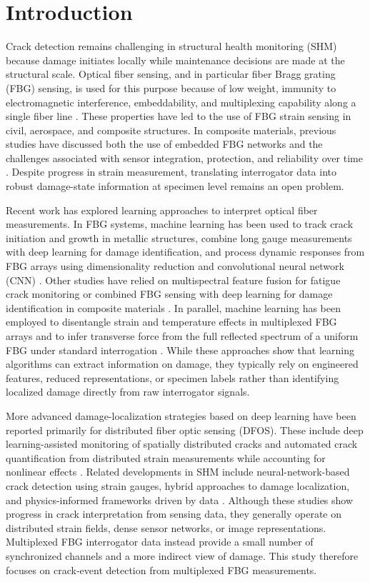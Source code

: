 \documentclass[notspecified,article,submit,pdftex,moreauthors]{Definitions/mdpi}
\begin{document}
\section{Introduction}

Crack detection remains challenging in structural health monitoring (SHM) because damage initiates locally while maintenance decisions are made at the structural scale. Optical fiber sensing, and in particular fiber Bragg grating (FBG) sensing, is used for this purpose because of low weight, immunity to electromagnetic interference, embeddability, and multiplexing capability along a single fiber line \cite{ye2014,yassin2024,golovastikov2025}. These properties have led to the use of FBG strain sensing in civil, aerospace, and composite structures. In composite materials, previous studies have discussed both the use of embedded FBG networks and the challenges associated with sensor integration, protection, and reliability over time \cite{kinet2014,gabardi2023}. Despite progress in strain measurement, translating interrogator data into robust damage-state information at specimen level remains an open problem.

Recent work has explored learning approaches to interpret optical fiber measurements. In FBG systems, machine learning has been used to track crack initiation and growth in metallic structures, combine long gauge measurements with deep learning for damage identification, and process dynamic responses from FBG arrays using dimensionality reduction and convolutional neural network (CNN) \cite{chilelli2019,zhang2020,wang2023}. Other studies have relied on multispectral feature fusion for fatigue crack monitoring or combined FBG sensing with deep learning for damage identification in composite materials \cite{zhao2025,xiong2025}. In parallel, machine learning has been employed to disentangle strain and temperature effects in multiplexed FBG arrays \cite{saha2025} and to infer transverse force from the full reflected spectrum of a uniform FBG under standard interrogation \cite{tocanne2025}. While these approaches show that learning algorithms can extract information on damage, they typically rely on engineered features, reduced representations, or specimen labels rather than identifying localized damage directly from raw interrogator signals.

More advanced damage-localization strategies based on deep learning have been reported primarily for distributed fiber optic sensing (DFOS). These include deep learning-assisted monitoring of spatially distributed cracks and automated crack quantification from distributed strain measurements while accounting for nonlinear effects \cite{liu2023,lu2025}. Related developments in SHM include neural-network-based crack detection using strain gauges, hybrid approaches to damage localization, and physics-informed frameworks driven by data \cite{yoon2022,moreh2025,si2025}. Although these studies show progress in crack interpretation from sensing data, they generally operate on distributed strain fields, dense sensor networks, or image representations. Multiplexed FBG interrogator data instead provide a small number of synchronized channels and a more indirect view of damage. This study therefore focuses on crack-event detection from multiplexed FBG measurements.
\end{document}
